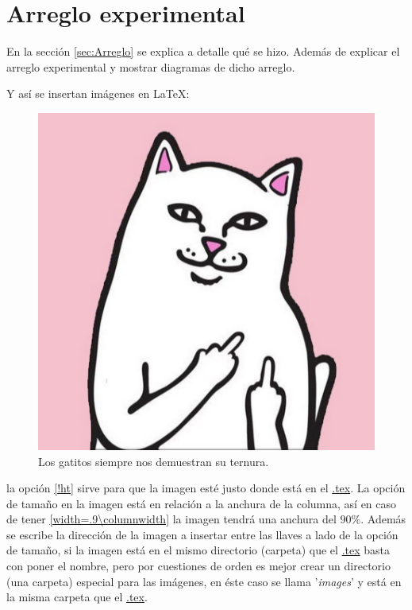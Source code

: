\documentclass[11pt, twocolumn]{article}
\begin{document}

\section*{Arreglo experimental}
\label{sec:Arreglo}


En la sección \ref{sec:Arreglo} se explica a detalle qué se hizo. Además de explicar el arreglo experimental y mostrar diagramas de dicho arreglo.

Y así se insertan imágenes en \LaTeX:

\begin{figure}[!ht]
	\centering
	\includegraphics[width=.8\columnwidth]{./images/yolo.jpg}
	\caption{Los gatitos siempre nos demuestran su ternura.}
	\label{figGatito}
\end{figure}

la opción \url{[!ht]} sirve para que la imagen esté justo donde está en el \url{.tex}. La opción de tamaño en la imagen está en relación a la anchura de la columna, así en caso de tener \url{[width=.9\columnwidth]} la imagen tendrá una anchura del $ 90 \% $. Además se escribe la dirección de la imagen a insertar entre las llaves a lado de la opción de tamaño, si la imagen está en el mismo directorio (carpeta) que el \url{.tex} basta con poner el nombre, pero por cuestiones de orden es mejor crear un directorio (una carpeta) especial para las imágenes, en éste caso se llama '\textit{images}' y está en la misma carpeta que el \url{.tex}.
\end{document}

